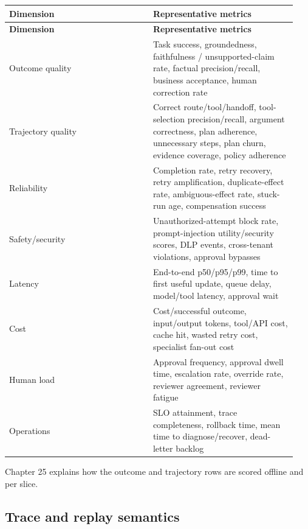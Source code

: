 \BookTableStart
\small
\begin{longtable}{@{}Y{0.4700\linewidth}Y{0.4700\linewidth}@{}}
\color{white}\bfseries \textbf{Dimension} & \color{white}\bfseries \textbf{Representative metrics} \\
\endfirsthead
{}
\color{white}\bfseries \textbf{Dimension} & \color{white}\bfseries \textbf{Representative metrics} \\
\endhead
Outcome quality & Task success, groundedness, faithfulness / unsupported-claim rate, factual precision/recall, business acceptance, human correction rate \\
Trajectory quality & Correct route/tool/handoff, tool-selection precision/recall, argument correctness, plan adherence, unnecessary steps, plan churn, evidence coverage, policy adherence \\
Reliability & Completion rate, retry recovery, retry amplification, duplicate-effect rate, ambiguous-effect rate, stuck-run age, compensation success \\
Safety/security & Unauthorized-attempt block rate, prompt-injection utility/security scores, DLP events, cross-tenant violations, approval bypasses \\
Latency & End-to-end p50/p95/p99, time to first useful update, queue delay, model/tool latency, approval wait \\
Cost & Cost/successful outcome, input/output tokens, tool/API cost, cache hit, wasted retry cost, specialist fan-out cost \\
Human load & Approval frequency, approval dwell time, escalation rate, override rate, reviewer agreement, reviewer fatigue \\
Operations & SLO attainment, trace completeness, rollback time, mean time to diagnose/recover, dead-letter backlog \\
\end{longtable}
\BookTableEnd

Chapter 25 explains how the outcome and trajectory rows are scored offline and per slice.\par

\subsection{Trace and replay semantics}

